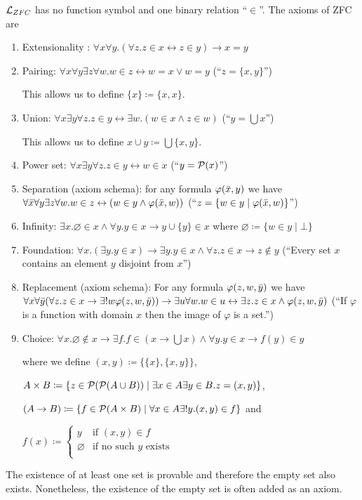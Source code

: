 \begin{defi}
    \alert{$\mathcal{L}_{ZFC}$} has no function symbol and one binary relation ``$\in$''. 
    The axioms of ZFC are
    \begin{enumerate}
        \item Extensionality : $\forall x \forall y. (\forall z. z \in x \leftrightarrow z \in y) \to x = y$
        \item Pairing: $\forall x \forall y \exists z \forall w. w \in z \leftrightarrow w = x \lor w = y$ (``$z = \{x,y\}$'')
        
        This allows us to define $\{x\} \coloneq \{x, x\}$.
        \item Union: $\forall x \exists y \forall z. z \in y \leftrightarrow \exists w. (w \in x \wedge z \in w)$ (``$y = \bigcup x$'')
        
        This allows us to define $x \cup y \coloneq \bigcup \{x, y\}$.
        \item Power set: $\forall x \exists y \forall z. z \in y \leftrightarrow w \in x$ (``$y = \mathcal{P}(x)$'')
        \item Separation (axiom schema): for any formula $\varphi(\bar{x}, y)$ we have $\forall \bar{x} \forall y \exists z \forall w. w \in z \leftrightarrow (w \in y \wedge \varphi(\bar{x}, w))$ (``$z = \{ w \in y \mid \varphi(\bar{x}, w)\}$'')
        \item Infinity: $\exists x. \varnothing \in x \wedge \forall y. y \in x \to y \cup \{y\} \in x$ where $\varnothing \coloneq \{w \in y \mid \bot\}$
        \item Foundation: $\forall x. (\exists y. y \in x) \to \exists y. y \in x \wedge \forall z. z \in x \to z \notin y$ (``Every set $x$ contains an element $y$ disjoint from $x$'')
        \item Replacement (axiom schema): For any formula $\varphi(z, w, \bar{y})$ we have $\forall x \forall \bar{y} (\forall z. z \in x \to \exists! w \varphi(z, w, \bar{y})) \to \exists u \forall w. w \in u \leftrightarrow \exists z. z \in x \wedge \varphi(z, w, \bar{y})$ (``If $\varphi$ is a function with domain $x$ then the image of $\varphi$ is a set.'')
        \item Choice: $\forall x. \varnothing \notin x \to \exists f. f \in (x \to \bigcup x) \wedge \forall y. y \in x  \to f(y) \in y$
        
        where we define $(x , y) \coloneq \{\{x\}, \{x, y\}\}$, 
        
        $A \times B \coloneq \{ z \in \mathcal{P}(\mathcal{P}(A \cup B)) \mid \exists x \in A \exists y \in B. z = (x, y)\}$, 
        
        $(A \to B) \coloneq \{f \in \mathcal{P}(A \times B) \mid \forall x \in A \exists! y. (x, y) \in f \}$ and
        
        $f(x) \coloneq 
        \begin{cases}
            y & \text{if } (x, y) \in f \\
            \varnothing & \text{if no such $y$ exists} \\
        \end{cases}$
    \end{enumerate}
\end{defi}

\begin{rem}
    The existence of at least one set is provable and therefore the empty set also exists. 
    Nonetheless, the existence of the empty set is often added as an axiom.
\end{rem}